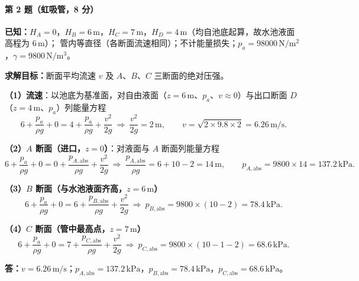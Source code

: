 \paragraph{第 2 题（虹吸管，8 分）}
\begin{jie}
\textbf{已知：}$H_A=0$，$H_B=6\,\mathrm{m}$，$H_C=7\,\mathrm{m}$，$H_D=4\,\mathrm{m}$（均自池底起算，故水池液面高程为 $6\,\mathrm{m}$）；
管内等直径（各断面流速相同）；不计能量损失；$p_a=98000\,\mathrm{N/m^2}$，$\gamma=9800\,\mathrm{N/m^3}$。

\textbf{求解目标：}断面平均流速 $v$ 及 $A$、$B$、$C$ 三断面的绝对压强。

\textbf{（1）流速}：以池底为基准面，对自由液面（$z=6\,\mathrm{m}$、$p_a$、$v\approx0$）与出口断面 $D$（$z=4\,\mathrm{m}$、$p_a$）列能量方程
\[
6+\frac{p_a}{\rho g}+0=4+\frac{p_a}{\rho g}+\frac{v^{2}}{2g}
\ \Longrightarrow\
\frac{v^{2}}{2g}=2\,\mathrm{m},\qquad
v=\sqrt{2\times9.8\times2}=6.26\,\mathrm{m/s}.
\]

\textbf{（2）$A$ 断面（进口，$z=0$）}：对液面与 $A$ 断面列能量方程
\[
6+\frac{p_a}{\rho g}+0=0+\frac{p_{A,\mathrm{abs}}}{\rho g}+\frac{v^{2}}{2g}
\ \Longrightarrow\
\frac{p_{A,\mathrm{abs}}}{\rho g}=6+10-2=14\,\mathrm{m},\qquad
p_{A,\mathrm{abs}}=9800\times14=137.2\,\mathrm{kPa}.
\]

\textbf{（3）$B$ 断面（与水池液面齐高，$z=6\,\mathrm{m}$）}
\[
6+\frac{p_a}{\rho g}+0=6+\frac{p_{B,\mathrm{abs}}}{\rho g}+\frac{v^{2}}{2g}
\ \Longrightarrow\
p_{B,\mathrm{abs}}=9800\times(10-2)=78.4\,\mathrm{kPa}.
\]

\textbf{（4）$C$ 断面（管中最高点，$z=7\,\mathrm{m}$）}
\[
6+\frac{p_a}{\rho g}+0=7+\frac{p_{C,\mathrm{abs}}}{\rho g}+\frac{v^{2}}{2g}
\ \Longrightarrow\
p_{C,\mathrm{abs}}=9800\times(10-1-2)=68.6\,\mathrm{kPa}.
\]

\textbf{答：}$v=6.26\,\mathrm{m/s}$；$p_{A,\mathrm{abs}}=137.2\,\mathrm{kPa}$，$p_{B,\mathrm{abs}}=78.4\,\mathrm{kPa}$，$p_{C,\mathrm{abs}}=68.6\,\mathrm{kPa}$。
\end{jie}

